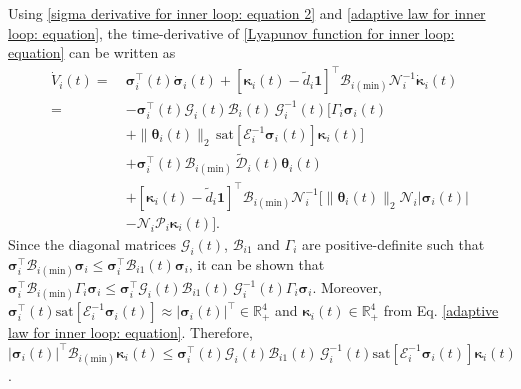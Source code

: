 \documentclass[lettersize,journal]{IEEEtran}
\begin{document}
\noindent Using \eqref{sigma derivative for inner loop: equation 2} and \eqref{adaptive law for inner loop: equation}, the time-derivative of \eqref{Lyapunov function for inner loop: equation} can be written as
\begin{align}
\label{Lyapunov derivative for inner loop: equation 1}
    \dot{V}_i(t)=~&\boldsymbol{\sigma}_i^{\top}(t) \dot{\boldsymbol{\sigma}}_i(t) + \left[\boldsymbol{\kappa}_i(t) - \tilde{d}_{i} \boldsymbol{1}\right]^{\top} \mathcal{B}_{i (\text{min})} \mathcal{N}_i^{-1} \dot{\boldsymbol{\kappa}}_i(t)\nonumber\\
    = & - \boldsymbol{\sigma}_i^{\top}(t) \mathcal{G}_i(t) \mathcal{B}_i(t) \, \mathcal{G}_i^{-1}(t) \Big[\Gamma_i \boldsymbol{\sigma}_i(t) \nonumber \\ 
    & + \lVert \boldsymbol{\theta}_i(t) \rVert_2 \, \text{sat}[ \mathcal{E}_i^{-1}\boldsymbol{\sigma}_i(t)] \boldsymbol{\kappa}_i(t)\Big] \nonumber\\
    & + \boldsymbol{\sigma}_i^{\top}(t) \mathcal{B}_{i (\text{min})} \, \tilde{\mathcal{D}}_i(t) \boldsymbol{\theta}_i(t) \nonumber\\
    & + \left[\boldsymbol{\kappa}_i(t) - \tilde{d}_{i} \boldsymbol{1}\right]^{\top} \mathcal{B}_{i (\text{min})} \mathcal{N}_i^{-1} \Big[\lVert \boldsymbol{\theta}_i(t) \rVert_2 \mathcal{N}_{i} \lvert \boldsymbol{\sigma}_i(t) \rvert \nonumber\\
    & - \mathcal{N}_{i} \mathcal{P}_{i} \boldsymbol{\kappa}_i(t) \Big].
\end{align} 
Since the diagonal matrices $\mathcal{G}_i(t)$, $\mathcal{B}_{i1}$ and $\Gamma_i$ are positive-definite such that $\boldsymbol{\sigma}_i^{\top} \mathcal{B}_{i (\text{min})} \boldsymbol{\sigma}_i \leq \boldsymbol{\sigma}_i^{\top}  \mathcal{B}_{i1}(t) \boldsymbol{\sigma}_i$, it can be shown that $\boldsymbol{\sigma}_i^{\top} \mathcal{B}_{i (\text{min})} \Gamma_i \boldsymbol{\sigma}_i \leq \boldsymbol{\sigma}_i^{\top}  \mathcal{G}_i(t) \mathcal{B}_{i1}(t) \, \mathcal{G}_i^{-1}(t) \Gamma_i \boldsymbol{\sigma}_i$.
Moreover, $\boldsymbol{\sigma}_i^{\top}(t) \text{sat}[ \mathcal{E}_i^{-1}\boldsymbol{\sigma}_i(t)] \approx \lvert \boldsymbol{\sigma}_i(t) \rvert^{\top} \in \mathbb{R}_+^4$ and $\boldsymbol{\kappa}_i(t) \in \mathbb{R}_+^4$ from Eq. \eqref{adaptive law for inner loop: equation}.
Therefore, $\lvert \boldsymbol{\sigma}_i(t) \rvert^{\top} \mathcal{B}_{i (\text{min})} \boldsymbol{\kappa}_i(t) \leq \boldsymbol{\sigma}_i^{\top}(t) \mathcal{G}_i(t) \mathcal{B}_{i1}(t) \, \mathcal{G}_i^{-1}(t) \text{sat}[ \mathcal{E}_i^{-1}\boldsymbol{\sigma}_i(t)] \boldsymbol{\kappa}_i(t)$.
\end{document}
